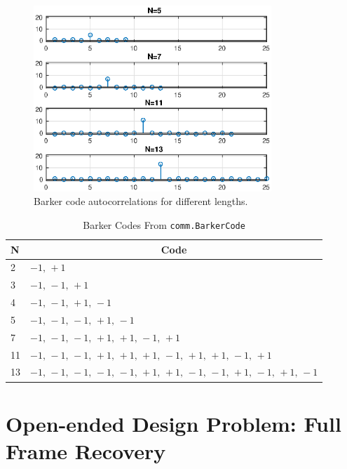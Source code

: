 \documentclass[letterpaper,12pt]{article}
\begin{document}
\newpage
%
\begin{figure}[ht!]\label{fig:barker_codes}
 \centering
 \includegraphics[width=0.8\textwidth]{barkerCodes.eps}
\caption{Barker code autocorrelations for different lengths.}
\end{figure}
%
\begin{table}[ht!]
\centering
\caption{Barker Codes From \texttt{comm.BarkerCode}}
\label{tbl:barkercode}\vspace*{3mm}
\begin{tabular}{l|l}
 N & \multicolumn{1}{c}{Code} \\ \hline
 2 & $-1,\, +1$ \\
 3 & $-1,\, -1,\, +1$ \\
 4 & $-1,\, -1,\, +1,\, -1$ \\
 5 & $-1,\, -1,\, -1,\, +1,\, -1$ \\
 7 & $-1,\, -1,\, -1,\, +1,\, +1,\, -1,\, +1$ \\
 11 & $-1,\, -1,\, -1,\, +1,\, +1,\, +1,\, -1,\, +1,\, +1,\, -1,\, +1$ \\
 13 & $-1,\, -1,\, -1,\, -1,\, -1,\, +1,\, +1,\, -1,\, -1,\, +1,\, -1,\, +1,\, -1$ \\
\end{tabular}
\end{table}

\newpage
\section{Open-ended Design Problem: Full Frame Recovery}
\end{document}
